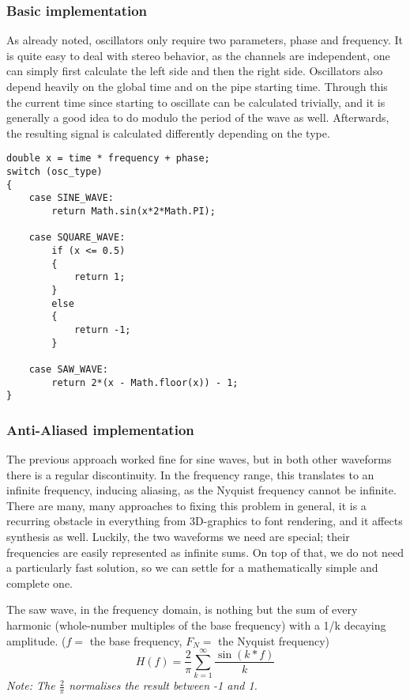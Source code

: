 \documentclass[11pt,a4paper]{article}
\begin{document}
\subsubsection{Basic implementation}

As already noted, oscillators only require two parameters, phase and frequency. It is quite easy to deal with stereo behavior, as the channels are independent, one can simply first calculate the left side and then the right side. Oscillators also depend heavily on the global time and on the pipe starting time. Through this the current time since starting to oscillate can be calculated trivially, and it is generally a good idea to do modulo the period of the wave as well. Afterwards, the resulting signal is calculated differently depending on the type.
\\\begin{minipage}{\linewidth}
\begin{lstlisting}
double x = time * frequency + phase;
switch (osc_type)
{
	case SINE_WAVE:
		return Math.sin(x*2*Math.PI);

	case SQUARE_WAVE:
		if (x <= 0.5)
		{
		    return 1;
		}
		else
		{
		    return -1;
		}

	case SAW_WAVE:
		return 2*(x - Math.floor(x)) - 1;
}
\end{lstlisting}
\end{minipage}

\subsubsection{Anti-Aliased implementation}

The previous approach worked fine for sine waves, but in both other waveforms there is a regular discontinuity. In the frequency range, this translates to an infinite frequency, inducing aliasing, as the Nyquist frequency cannot be infinite.
There are many, many approaches to fixing this problem in general, it is a recurring obstacle in everything from 3D-graphics to font rendering, and it affects synthesis as well. Luckily, the two waveforms we need are special; their frequencies are easily represented as infinite sums. On top of that, we do not need a particularly fast solution, so we can settle for a mathematically simple and complete one.

The saw wave, in the frequency domain, is nothing but the sum of every harmonic (whole-number multiples of the base frequency) with a 1/k decaying amplitude.
(\(f = \) the base frequency, \(F_N = \) the Nyquist frequency)
\begin{equation}
H(f) = \frac{2}{\pi}\sum\limits_{k=1}^\infty{\frac{\sin(k*f)}{k}}
\end{equation}
{\small \it Note: The \(\frac{2}{\pi}\) normalises the result between -1 and 1.}
\end{document}
